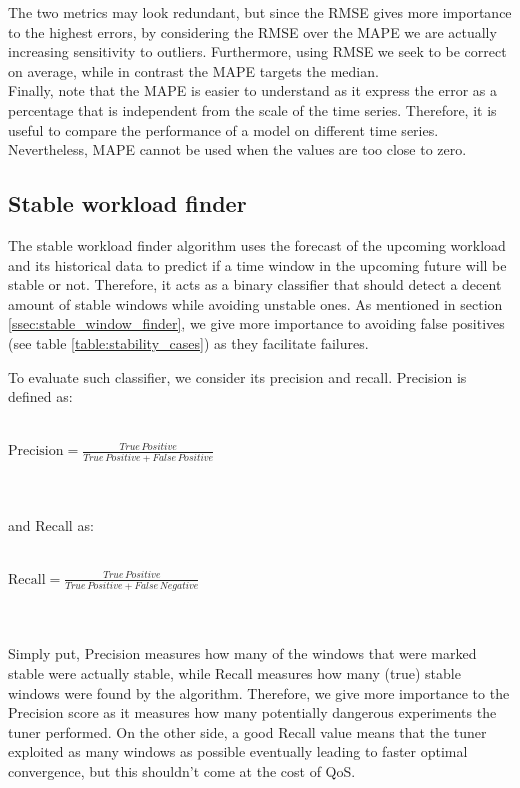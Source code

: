 \documentclass[a4paper, 12pt]{article} %
\begin{document}
	The two metrics may look redundant, but since the RMSE gives more importance to the highest errors, by considering the RMSE over the MAPE we are actually increasing sensitivity to outliers. Furthermore, using RMSE we seek to be correct on average, while in contrast the MAPE targets the median.\\
	Finally, note that the MAPE is easier to understand as it express the error as a percentage that is independent from the scale of the time series. Therefore, it is useful to compare the performance of a model on different time series. Nevertheless, MAPE cannot be used when the values are too close to zero.
	
	\subsection{Stable workload finder } \label{ssec:exp_stable_wkld_finder}
	The stable workload finder algorithm uses the forecast of the upcoming workload and its historical data to predict if a time window in the upcoming future will be stable or not. Therefore, it acts as a binary classifier that should detect a decent amount of stable windows while avoiding unstable ones. As mentioned in section \ref{ssec:stable_window_finder}, we give more importance to avoiding false positives (see table \ref{table:stability_cases}) as they facilitate failures.
	
	To evaluate such classifier, we consider its precision and recall. Precision is defined as:\\\\
	\centerline{
	$
	\text{Precision} = \frac{ True \, Positive}{ True \, Positive + False \, Positive}
	$
	}\\\\
	and Recall as:\\\\
	\centerline{
		$
		\text{Recall} = \frac{ True \, Positive}{ True \, Positive + False \, Negative}
		$
	}\\\\
	Simply put, Precision measures how many of the windows that were marked stable were actually stable, while Recall measures how many (true) stable windows were found by the algorithm. Therefore, we give more importance to the Precision score as it measures how many potentially dangerous experiments the tuner performed. On the other side, a good Recall value means that the tuner exploited as many windows as possible eventually leading to faster optimal convergence, but this shouldn't come at the cost of QoS.
	
\end{document}
